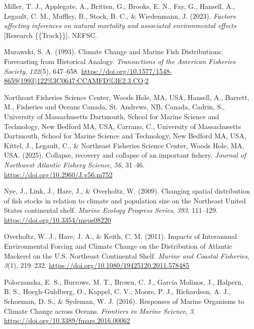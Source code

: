 \documentclass[
  12pt,
]{article}
\newlength{\cslhangindent}
\newenvironment{CSLReferences}[2] %
 {\begin{list}{}{%
  \setlength{\itemindent}{0pt}
  \setlength{\leftmargin}{0pt}
  \setlength{\parsep}{0pt}
  \ifodd #1
   \setlength{\leftmargin}{\cslhangindent}
   \setlength{\itemindent}{-1\cslhangindent}
  \fi
  \setlength{\itemsep}{#2\baselineskip}}}
 {\end{list}}
\begin{document}
\begin{CSLReferences}{1}{2}
Miller, T. J., Applegate, A., Britten, G., Brooks, E. N., Fay, G., Hansell, A., Legault, C. M., Muffley, B., Stock, B. C., \& Wiedenmann, J. (2023). \emph{Factors affecting inferences on natural mortality and associated environmental effects} {[}Research \{\{Track\}\}{]}. NEFSC.

Murawski, S. A. (1993). Climate Change and Marine Fish Distributions: Forecasting from Historical Analogy. \emph{Transactions of the American Fisheries Society}, \emph{122}(5), 647--658. \url{https://doi.org/10.1577/1548-8659(1993)122\%3C0647:CCAMFD\%3E2.3.CO;2}

Northeast Fisheries Science Center, Woods Hole, MA, USA, Hansell, A., Barrett, M., Fisheries and Oceans Canada, St. Andrews, NB, Canada, Cadrin, S., University of Massachusetts Dartmouth, School for Marine Science and Technology, New Bedford MA, USA, Carrano, C., University of Massachusetts Dartmouth, School for Marine Science and Technology, New Bedford MA, USA, Kittel, J., Legault, C., \& Northeast Fisheries Science Center, Woods Hole, MA, USA. (2025). Collapse, recovery and collapse of an important fishery. \emph{Journal of Northwest Atlantic Fishery Science}, \emph{56}, 31--46. \url{https://doi.org/10.2960/J.v56.m752}

Nye, J., Link, J., Hare, J., \& Overholtz, W. (2009). Changing spatial distribution of fish stocks in relation to climate and population size on the Northeast United States continental shelf. \emph{Marine Ecology Progress Series}, \emph{393}, 111--129. \url{https://doi.org/10.3354/meps08220}

Overholtz, W. J., Hare, J. A., \& Keith, C. M. (2011). Impacts of Interannual Environmental Forcing and Climate Change on the Distribution of Atlantic Mackerel on the U.S. Northeast Continental Shelf. \emph{Marine and Coastal Fisheries}, \emph{3}(1), 219--232. \url{https://doi.org/10.1080/19425120.2011.578485}

Poloczanska, E. S., Burrows, M. T., Brown, C. J., García Molinos, J., Halpern, B. S., Hoegh-Guldberg, O., Kappel, C. V., Moore, P. J., Richardson, A. J., Schoeman, D. S., \& Sydeman, W. J. (2016). Responses of Marine Organisms to Climate Change across Oceans. \emph{Frontiers in Marine Science}, \emph{3}. \url{https://doi.org/10.3389/fmars.2016.00062}


\end{CSLReferences}
\end{document}
